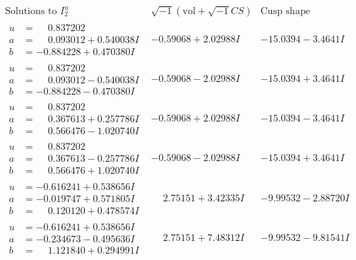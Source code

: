 \documentclass[1p]{elsarticle_modified}
\theoremstyle{definition}
\newcommand{\I}{\sqrt{-1}}
\begin{document}
$$\begin{array}{c|c|c}  
\text{Solutions to }I^u_{2}& \I (\text{vol} + \sqrt{-1}CS) & \text{Cusp shape}\\
 \hline 
\begin{aligned}
u &= \phantom{-}0.837202\phantom{ +0.000000I} \\
a &= \phantom{-}0.093012 + 0.540038 I \\
b &= -0.884228 + 0.470380 I\end{aligned}
 & -0.59068 + 2.02988 I & -15.0394 - 3.4641 I \\ \hline\begin{aligned}
u &= \phantom{-}0.837202\phantom{ +0.000000I} \\
a &= \phantom{-}0.093012 - 0.540038 I \\
b &= -0.884228 - 0.470380 I\end{aligned}
 & -0.59068 - 2.02988 I & -15.0394 + 3.4641 I \\ \hline\begin{aligned}
u &= \phantom{-}0.837202\phantom{ +0.000000I} \\
a &= \phantom{-}0.367613 + 0.257786 I \\
b &= \phantom{-}0.566476 - 1.020740 I\end{aligned}
 & -0.59068 + 2.02988 I & -15.0394 - 3.4641 I \\ \hline\begin{aligned}
u &= \phantom{-}0.837202\phantom{ +0.000000I} \\
a &= \phantom{-}0.367613 - 0.257786 I \\
b &= \phantom{-}0.566476 + 1.020740 I\end{aligned}
 & -0.59068 - 2.02988 I & -15.0394 + 3.4641 I \\ \hline\begin{aligned}
u &= -0.616241 + 0.538656 I \\
a &= -0.019747 + 0.571805 I \\
b &= \phantom{-}0.120120 + 0.478574 I\end{aligned}
 & \phantom{-}2.75151 + 3.42335 I & -9.99532 - 2.88720 I \\ \hline\begin{aligned}
u &= -0.616241 + 0.538656 I \\
a &= -0.234673 - 0.495636 I \\
b &= \phantom{-}1.121840 + 0.294991 I\end{aligned}
 & \phantom{-}2.75151 + 7.48312 I & -9.99532 - 9.81541 I \\ \hline\begin{aligned}

\end{aligned}
\end{array}$$
\end{document}
